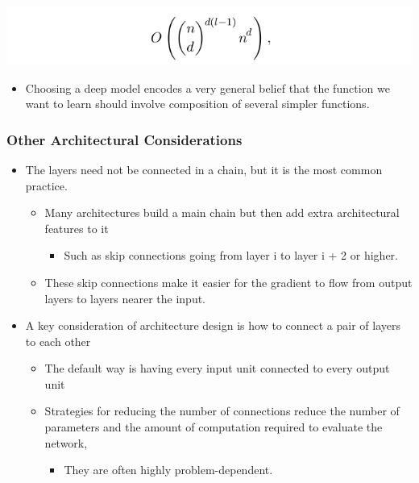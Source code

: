 \documentclass[11pt]{article}
\begin{document}
\begin{center}
\includegraphics[width=.9\linewidth]{Deep Feedforward Networks/screenshot_2018-10-01_17-14-50.png}
\end{center}

\begin{itemize}
\item Choosing a deep model encodes a very general belief that the function we want to learn should involve composition of several simpler functions.
\end{itemize}

\subsubsection{Other Architectural Considerations}
\label{sec:orge05a8dc}
\begin{itemize}
\item The layers need not be connected in a chain, but it is the most common practice.
\begin{itemize}
\item Many architectures build a main chain but then add extra architectural features to it
\begin{itemize}
\item Such as skip connections going from layer i to layer i + 2 or higher.
\end{itemize}
\item These skip connections make it easier for the gradient to ﬂow from output layers to layers nearer the input.
\end{itemize}

\item A key consideration of architecture design is how to connect a pair of layers to each other
\begin{itemize}
\item The default way is having every input unit connected to every output unit
\item Strategies for reducing the number of connections reduce the number of parameters and the amount of computation required to evaluate the network,
\begin{itemize}
\item They are often highly problem-dependent.
\end{itemize}
\end{itemize}
\end{itemize}
\end{document}
